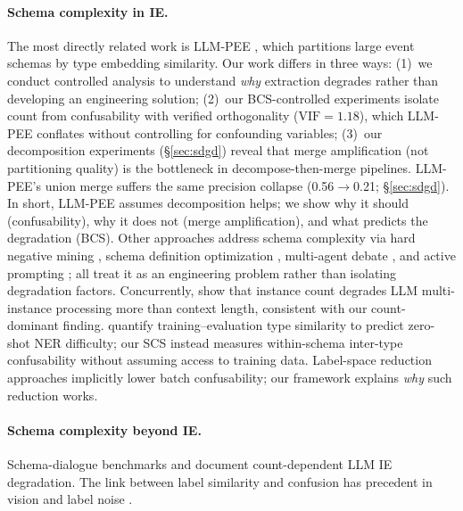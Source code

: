 \paragraph{Schema complexity in IE.}
The most directly related work is LLM-PEE \citep{llm-pee-2025}, which partitions large event schemas by type embedding similarity. Our work differs in three ways: (1)~we conduct controlled analysis to understand \emph{why} extraction degrades rather than developing an engineering solution; (2)~our BCS-controlled experiments isolate count from confusability with verified orthogonality ($\text{VIF}=1.18$), which LLM-PEE conflates without controlling for confounding variables; (3)~our decomposition experiments (\S\ref{sec:sdgd}) reveal that merge amplification (not partitioning quality) is the bottleneck in decompose-then-merge pipelines. LLM-PEE's union merge suffers the same precision collapse (0.56$\to$0.21; \S\ref{sec:sdgd}). In short, LLM-PEE assumes decomposition helps; we show why it should (confusability), why it does not (merge amplification), and what predicts the degradation (BCS). Other approaches address schema complexity via hard negative mining \citep{iepile-2024}, schema definition optimization \citep{parse-2025}, multi-agent debate \citep{crossagentie-2025,cmas-ner-2025}, and active prompting \citep{reflect-learn-2026}; all treat it as an engineering problem rather than isolating degradation factors. Concurrently, \citet{chen-2026-multi-instance} show that instance count degrades LLM multi-instance processing more than context length, consistent with our count-dominant finding. \citet{golde-2025-familiarity} quantify training--evaluation type similarity to predict zero-shot NER difficulty; our SCS instead measures within-schema inter-type confusability without assuming access to training data. Label-space reduction approaches \citep{haystack-to-needle-2025,dlisc-2025,spt-2025} implicitly lower batch confusability; our framework explains \emph{why} such reduction works.

\paragraph{Schema complexity beyond IE.}
Schema-dialogue benchmarks \citep{rastogi2020towards,lee2022sgd} and \citet{li2023evaluating} document count-dependent LLM IE degradation. The link between label similarity and confusion has precedent in vision \citep{dubey-2018-pairwise-confusion,deng-2010-imagenet} and label noise \citep{collier-2021-correlated-noise,guo-2021-label-confusion}.

